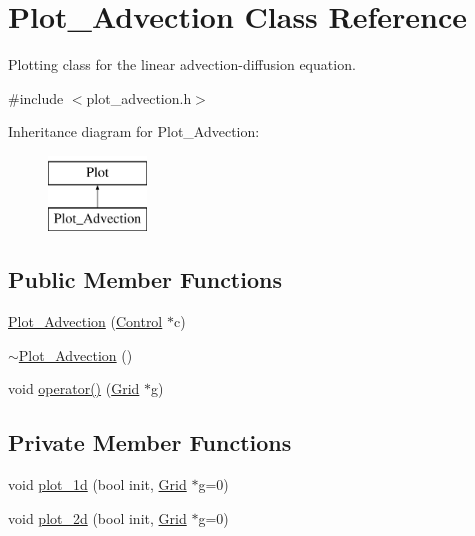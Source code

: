 \hypertarget{class_plot___advection}{}\section{Plot\+\_\+\+Advection Class Reference}
\label{class_plot___advection}


Plotting class for the linear advection-\/diffusion equation.  




{\ttfamily \#include $<$plot\+\_\+advection.\+h$>$}

Inheritance diagram for Plot\+\_\+\+Advection\+:\begin{figure}[H]
\begin{center}
\leavevmode
\includegraphics[height=2.000000cm]{class_plot___advection}
\end{center}
\end{figure}
\subsection*{Public Member Functions}
\begin{DoxyCompactItemize}
\item 
\hyperlink{class_plot___advection_a5d506920ee2b9b7f54382208ca31db28}{Plot\+\_\+\+Advection} (\hyperlink{class_control}{Control} $\ast$c)
\item 
\hyperlink{class_plot___advection_aa4836efc4922b4ba4f7788315d4e4994}{$\sim$\+Plot\+\_\+\+Advection} ()
\item 
void \hyperlink{class_plot___advection_aa8f4020a38efe82391d6ec2c30cb2846}{operator()} (\hyperlink{class_grid}{Grid} $\ast$g)
\end{DoxyCompactItemize}
\subsection*{Private Member Functions}
\begin{DoxyCompactItemize}
\item 
void \hyperlink{class_plot___advection_a1d5fb2abcc9dedfcc81dd287fd5ba011}{plot\+\_\+1d} (bool init, \hyperlink{class_grid}{Grid} $\ast$g=0)
\item 
void \hyperlink{class_plot___advection_aaf3bbdc51c7f960782bab06e2efa7643}{plot\+\_\+2d} (bool init, \hyperlink{class_grid}{Grid} $\ast$g=0)
\end{DoxyCompactItemize}
